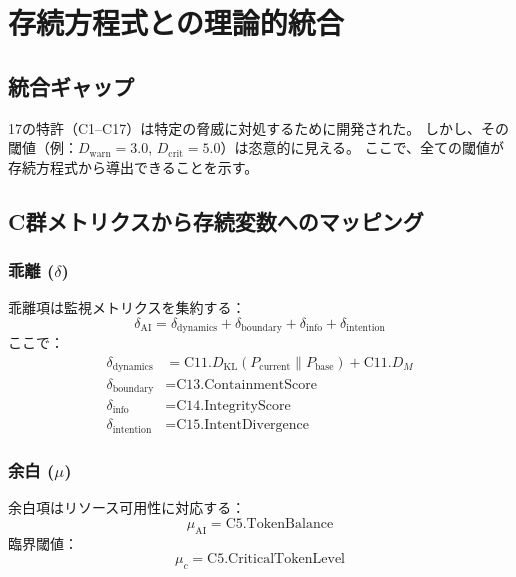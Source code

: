 \documentclass[11pt,a4paper]{article}
\newcommand{\muc}{\mu_c}
\newcommand{\DKL}{D_{\text{KL}}}
\begin{document}
\section{存続方程式との理論的統合}
\label{sec:unification}

\subsection{統合ギャップ}

17の特許（C1--C17）は特定の脅威に対処するために開発された。
しかし、その閾値（例：$D_{\text{warn}} = 3.0$, $D_{\text{crit}} = 5.0$）は恣意的に見える。
ここで、全ての閾値が存続方程式から導出できることを示す。

\subsection{C群メトリクスから存続変数へのマッピング}

\subsubsection{乖離 ($\delta$)}

乖離項は監視メトリクスを集約する：
\begin{equation}
\delta_{\text{AI}} = \delta_{\text{dynamics}} + \delta_{\text{boundary}} + \delta_{\text{info}} + \delta_{\text{intention}}
\end{equation}
ここで：
\begin{align}
\delta_{\text{dynamics}} &= \text{C11.}\DKL(P_{\text{current}} \| P_{\text{base}}) + \text{C11.}D_M \\
\delta_{\text{boundary}} &= \text{C13.ContainmentScore} \\
\delta_{\text{info}} &= \text{C14.IntegrityScore} \\
\delta_{\text{intention}} &= \text{C15.IntentDivergence}
\end{align}

\subsubsection{余白 ($\mu$)}

余白項はリソース可用性に対応する：
\begin{equation}
\mu_{\text{AI}} = \text{C5.TokenBalance}
\end{equation}
臨界閾値：
\begin{equation}
\muc = \text{C5.CriticalTokenLevel}
\end{equation}
\end{document}
